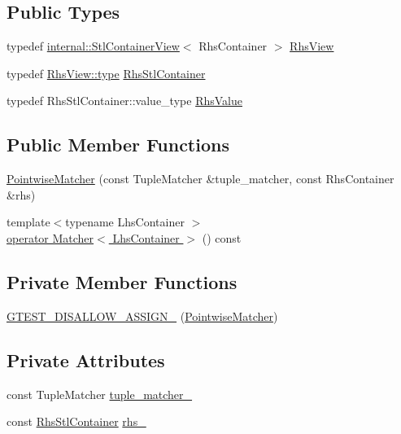 \subsection*{Public Types}
\begin{DoxyCompactItemize}
\item 
typedef \hyperlink{classtesting_1_1internal_1_1StlContainerView}{internal\+::\+Stl\+Container\+View}$<$ Rhs\+Container $>$ \hyperlink{classtesting_1_1internal_1_1PointwiseMatcher_a215d397bfaf0f8bc948cb7b5ff9100c9}{Rhs\+View}
\item 
typedef \hyperlink{classtesting_1_1internal_1_1StlContainerView_a2b2c63a6dcdbfe63fb0ee121ebf463ba}{Rhs\+View\+::type} \hyperlink{classtesting_1_1internal_1_1PointwiseMatcher_aadbaec8c93351f29b103816c2e397edd}{Rhs\+Stl\+Container}
\item 
typedef Rhs\+Stl\+Container\+::value\+\_\+type \hyperlink{classtesting_1_1internal_1_1PointwiseMatcher_a9f7f1abbfa795033e1e1c1df385b4617}{Rhs\+Value}
\end{DoxyCompactItemize}
\subsection*{Public Member Functions}
\begin{DoxyCompactItemize}
\item 
\hyperlink{classtesting_1_1internal_1_1PointwiseMatcher_aa6e63218a93062d5055428462417821f}{Pointwise\+Matcher} (const Tuple\+Matcher \&tuple\+\_\+matcher, const Rhs\+Container \&rhs)
\item 
{\footnotesize template$<$typename Lhs\+Container $>$ }\\\hyperlink{classtesting_1_1internal_1_1PointwiseMatcher_a50b68745b7fea83ab076b22fa0497e7d}{operator Matcher$<$ Lhs\+Container $>$} () const
\end{DoxyCompactItemize}
\subsection*{Private Member Functions}
\begin{DoxyCompactItemize}
\item 
\hyperlink{classtesting_1_1internal_1_1PointwiseMatcher_a172a4f317cfe3d6b4f5b0f71b14a912c}{G\+T\+E\+S\+T\+\_\+\+D\+I\+S\+A\+L\+L\+O\+W\+\_\+\+A\+S\+S\+I\+G\+N\+\_\+} (\hyperlink{classtesting_1_1internal_1_1PointwiseMatcher}{Pointwise\+Matcher})
\end{DoxyCompactItemize}
\subsection*{Private Attributes}
\begin{DoxyCompactItemize}
\item 
const Tuple\+Matcher \hyperlink{classtesting_1_1internal_1_1PointwiseMatcher_a88ff006de49679fa44b438bfa1f6d153}{tuple\+\_\+matcher\+\_\+}
\item 
const \hyperlink{classtesting_1_1internal_1_1PointwiseMatcher_aadbaec8c93351f29b103816c2e397edd}{Rhs\+Stl\+Container} \hyperlink{classtesting_1_1internal_1_1PointwiseMatcher_a99dc64b7cd3d5f78742d8a3ed2c4793c}{rhs\+\_\+}
\end{DoxyCompactItemize}


